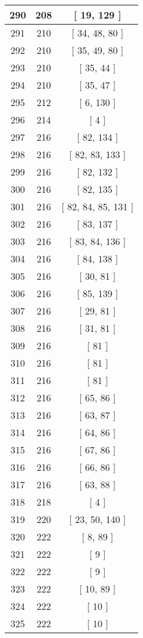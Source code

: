 \begin{center}
\begin{longtable}[H]{|| c c c ||}
\hline
290 & 208 & [ 19, 129 ] \\ 
\hline
291 & 210 & [ 34, 48, 80 ] \\ 
\hline
292 & 210 & [ 35, 49, 80 ] \\ 
\hline
293 & 210 & [ 35, 44 ] \\ 
\hline
294 & 210 & [ 35, 47 ] \\ 
\hline
295 & 212 & [ 6, 130 ] \\ 
\hline
296 & 214 & [ 4 ] \\ 
\hline
297 & 216 & [ 82, 134 ] \\ 
\hline
298 & 216 & [ 82, 83, 133 ] \\ 
\hline
299 & 216 & [ 82, 132 ] \\ 
\hline
300 & 216 & [ 82, 135 ] \\ 
\hline
301 & 216 & [ 82, 84, 85, 131 ] \\ 
\hline
302 & 216 & [ 83, 137 ] \\ 
\hline
303 & 216 & [ 83, 84, 136 ] \\ 
\hline
304 & 216 & [ 84, 138 ] \\ 
\hline
305 & 216 & [ 30, 81 ] \\ 
\hline
306 & 216 & [ 85, 139 ] \\ 
\hline
307 & 216 & [ 29, 81 ] \\ 
\hline
308 & 216 & [ 31, 81 ] \\ 
\hline
309 & 216 & [ 81 ] \\ 
\hline
310 & 216 & [ 81 ] \\ 
\hline
311 & 216 & [ 81 ] \\ 
\hline
312 & 216 & [ 65, 86 ] \\ 
\hline
313 & 216 & [ 63, 87 ] \\ 
\hline
314 & 216 & [ 64, 86 ] \\ 
\hline
315 & 216 & [ 67, 86 ] \\ 
\hline
316 & 216 & [ 66, 86 ] \\ 
\hline
317 & 216 & [ 63, 88 ] \\ 
\hline
318 & 218 & [ 4 ] \\ 
\hline
319 & 220 & [ 23, 50, 140 ] \\ 
\hline
320 & 222 & [ 8, 89 ] \\ 
\hline
321 & 222 & [ 9 ] \\ 
\hline
322 & 222 & [ 9 ] \\ 
\hline
323 & 222 & [ 10, 89 ] \\ 
\hline
324 & 222 & [ 10 ] \\ 
\hline
325 & 222 & [ 10 ] \\ 

\end{longtable}
\end{center}
